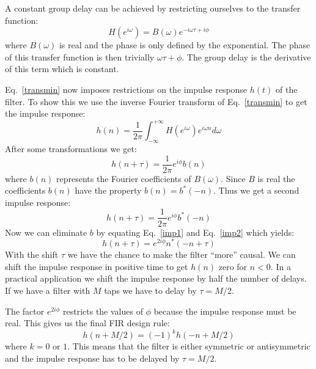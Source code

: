 \documentclass[12pt,a4paper]{article}
\begin{document}
A constant group delay can be achieved by restricting ourselves to
the transfer function:
\begin{equation}
H(e^{i\omega})=B(\omega)e^{-i\omega\tau+i\phi} \label{transmin}
\end{equation}
where $B(\omega)$ is real and the phase is only defined by the exponential.
The phase of this transfer function is then trivially $\omega\tau+\phi$. The
group delay is the derivative of this term which is constant.

Eq.~\ref{transmin} now imposes restrictions on the impulse response $h(t)$
of the filter. To show this we use the inverse Fourier transform of
Eq.~\ref{transmin} to get the impulse response:
\begin{equation}
h(n)=\frac{1}{2\pi}\int_{-\infty}^{+\infty} H(e^{i\omega})
e^{i\omega n}d \omega
\end{equation}
After some transformations we get:
\begin{equation}
h(n+\tau)=\frac{1}{2\pi}e^{i\phi}b(n) \label{imp1}
\end{equation}
where $b(n)$ represents the Fourier coefficients of $B(\omega)$. Since $B$ is
real the coefficients $b(n)$ have the property $b(n)=b^*(-n)$.
Thus we get a second impulse response:
\begin{equation}
h(n+\tau)=\frac{1}{2\pi}e^{i\phi}b^*(-n) \label{imp2}
\end{equation}
Now we can eliminate $b$ by equating Eq.~\ref{imp1} and Eq.~\ref{imp2} which
yields:
\begin{equation}
h(n+\tau)=e^{2i\phi} n^*(-n+\tau)
\end{equation}
With the shift $\tau$ we have the chance to make the filter ``more''
causal. We can shift the impulse response in positive time to get
$h(n)$ zero for $n<0$. In a practical application we shift the impulse
response by half the number of delays. If we have a filter with $M$
taps we have to delay by $\tau=M/2$.

The factor $e^{2i\phi}$ restricts the values of $\phi$ because the impulse
response must be real. This gives us the final FIR design rule:
\begin{equation}
h(n+M/2)=(-1)^k h(-n+M/2)
\end{equation}
where $k=0$ or $1$. This means that the filter is either symmetric or
antisymmetric and the impulse response has to be delayed by $\tau=M/2$.
\end{document}
